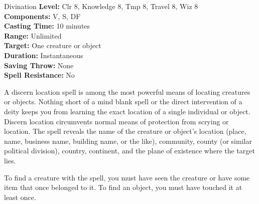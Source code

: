{Divination}
{
	\textbf{Level:}
	Clr 8, Knowledge 8, Tmp 8, Travel 8, Wiz 8\\
	\textbf{Components:}
	V, S, DF\\
	\textbf{Casting Time:}
	10 minutes\\
	\textbf{Range:}
	Unlimited\\
	\textbf{Target:}
	One creature or object\\
	\textbf{Duration:}
	Instantaneous\\
	\textbf{Saving Throw:}
	None\\
	\textbf{Spell Resistance:}
	No\\
}
{
	A discern location spell is among the most powerful means of locating creatures or objects. Nothing short of a mind blank spell or the direct intervention of a deity keeps you from learning the exact location of a single individual or object. Discern location circumvents normal means of protection from scrying or location. The spell reveals the name of the creature or object's location (place, name, business name, building name, or the like), community, county (or similar political division), country, continent, and the plane of existence where the target lies.

	To find a creature with the spell, you must have seen the creature or have some item that once belonged to it. To find an object, you must have touched it at least once.

}

